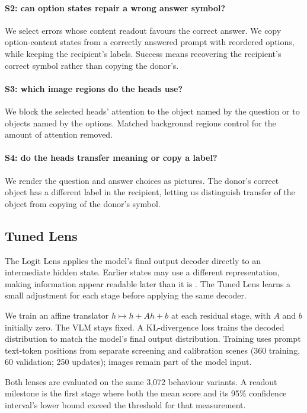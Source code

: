 \documentclass[11pt]{article}
\begin{document}
\paragraph{S2: can option states repair a wrong answer symbol?} We select errors whose content readout favours the correct answer. We copy option-content states from a correctly answered prompt with reordered options, while keeping the recipient's labels. Success means recovering the recipient's correct symbol rather than copying the donor's.

\paragraph{S3: which image regions do the heads use?} We block the selected heads' attention to the object named by the question or to objects named by the options. Matched background regions control for the amount of attention removed.

\paragraph{S4: do the heads transfer meaning or copy a label?} We render the question and answer choices as pictures. The donor's correct object has a different label in the recipient, letting us distinguish transfer of the object from copying of the donor's symbol.

\subsection{Tuned Lens}

The Logit Lens applies the model's final output decoder directly to an intermediate hidden state. Earlier states may use a different representation, making information appear readable later than it is \citep{belrose2023tunedlens}. The Tuned Lens learns a small adjustment for each stage before applying the same decoder.

We train an affine translator $h \mapsto h + Ah + b$ at each residual stage, with $A$ and $b$ initially zero. The VLM stays fixed. A KL-divergence loss trains the decoded distribution to match the model's final output distribution. Training uses prompt text-token positions from separate screening and calibration scenes (360 training, 60 validation; 250 updates); images remain part of the model input.

Both lenses are evaluated on the same 3,072 behaviour variants. A readout milestone is the first stage where both the mean score and its 95\% confidence interval's lower bound exceed the threshold for that measurement.
\end{document}
